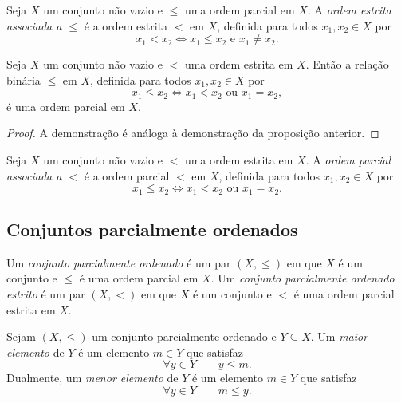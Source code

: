 \begin{definition}
	Seja $X$ um conjunto não vazio e $\leq$ uma ordem parcial em $X$. A \emph{ordem estrita associada a $\leq$} é a ordem estrita $<$ em $X$, definida para todos $x_1,x_2 \in X$ por
	\begin{equation*}
	x_1 < x_2 \Leftrightarrow x_1 \leq x_2 \text{\ \ e\ \ } x_1 \neq x_2.
	\end{equation*}
\end{definition}

\begin{proposition}
	Seja $X$ um conjunto não vazio e $<$ uma ordem estrita em $X$. Então a relação binária $\leq$ em $X$, definida para todos $x_1,x_2 \in X$ por
	\begin{equation*}
	x_1 \leq x_2 \Leftrightarrow x_1 < x_2 \text{\ \ ou\ \ } x_1 = x_2,
	\end{equation*}
é uma ordem parcial em $X$.
\end{proposition}
\begin{proof}
	A demonstração é análoga à demonstração da proposição anterior.
\end{proof}

\begin{definition}
	Seja $X$ um conjunto não vazio e $<$ uma ordem estrita em $X$. A \emph{ordem parcial associada a $<$} é a ordem parcial $<$ em $X$, definida para todos $x_1,x_2 \in X$ por
	\begin{equation*}
	x_1 \leq x_2 \Leftrightarrow x_1 < x_2 \text{\ \ ou\ \ } x_1 = x_2.
	\end{equation*}
\end{definition}

\subsection{Conjuntos parcialmente ordenados}

\begin{definition}
	Um \emph{conjunto parcialmente ordenado} é um par $(X,\leq)$ em que $X$ é um conjunto e $\leq$ é uma ordem parcial em $X$. Um \emph{conjunto parcialmente ordenado estrito} é um par $(X,<)$ em que $X$ é um conjunto e $<$ é uma ordem parcial estrita em $X$.
\end{definition}

\begin{definition}
	Sejam $(X,\leq)$ um conjunto parcialmente ordenado e $Y \subseteq X$. Um \emph{maior elemento} de $Y$ é um elemento $m \in Y$ que satisfaz
	\begin{equation*}
	\forall y \in Y \qquad y \leq m.
	\end{equation*}
Dualmente, um \emph{menor elemento} de $Y$ é um elemento $m \in Y$ que satisfaz
	\begin{equation*}
	\forall y \in Y \qquad m \leq y.
	\end{equation*}
\end{definition}

